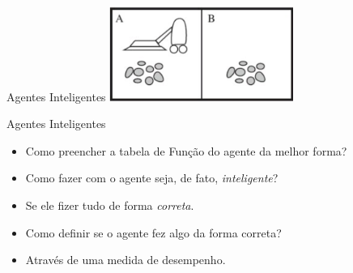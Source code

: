 \documentclass{libs/ufc_format}
\begin{document}
\begin{frame}{Agentes Inteligentes}
    \centering
    \includegraphics[width=0.45\textwidth]{figuras/figura03}
\end{frame}

\begin{frame}{Agentes Inteligentes}
    \begin{itemize}
        \justifying
        \item Como preencher a tabela de Função do agente da melhor forma?
        \item<2-> Como fazer com o agente seja, de fato, \textit{inteligente}?
        \item<3-> Se ele fizer tudo de forma \textit{correta}.
        \item<3-> Como definir se o agente fez algo da forma correta?
        \item<4> Através de uma medida de desempenho.
    \end{itemize}
\end{frame}
\end{document}
